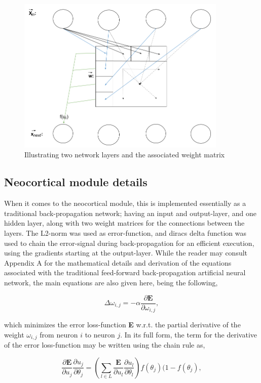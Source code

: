\begin{figure}
    \centering
    \includegraphics[width=10cm]{fig/network_propagation}
    \caption{Illustrating two network layers and the associated weight matrix}
    \label{fig:network_layout}
\end{figure}


\subsection{Neocortical module details}

When it comes to the neocortical module, this is implemented essentially as a traditional back-propagation network; having an input and output-layer, and one hidden layer, along with two weight matrices for the connections between the layers. The L2-norm was used as error-function, and diracs delta function was used to chain the error-signal during back-propagation for an efficient execution, using the gradients starting at the output-layer. While the reader may consult Appendix A for the mathematical details and derivation of the equations associated with the traditional feed-forward back-propagation artificial neural network, the main equations are also given here, being the following,

\begin{equation}
    \Delta \omega_{i,j} = -\alpha \frac{\partial \textbf{E}}{\partial \omega_{i,j}},
\end{equation}

\noindent
which minimizes the error loss-function \textbf{E} w.r.t. the partial derivative of the weight $\omega_{i,j}$ from neuron $i$ to neuron $j$.
In its full form, the term for the derivative of the error loss-function may be written using the chain rule as,

\begin{equation}
    \frac{\partial \textbf{E}}{\partial u_j}\frac{\partial u_j}{\partial \theta_j} = 
    (\sum_{l \in L}\frac{\textbf{E}}{\partial u_l}\frac{\partial u_l}{\partial \theta_l}) f(\theta_j)(1-f(\theta_j),
\end{equation}


